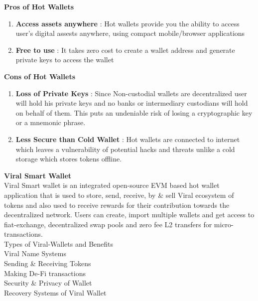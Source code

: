 \documentclass[conference]{IEEEtran}
\begin{document}
\textbf{Pros of Hot Wallets}
\begin{enumerate}[wide, labelwidth=!, labelindent=0pt]
\item \textbf{Access assets anywhere} : Hot wallets provide you the ability to access user's digital assests anywhere, using compact mobile/browser applications
\item \textbf{Free to use} : It takes zero cost to create a wallet address and generate private keys to access the wallet
\end{enumerate}

\textbf{Cons of Hot Wallets}
\begin{enumerate}[wide, labelwidth=!, labelindent=0pt]
\item \textbf{Loss of Private Keys} : Since Non-custodial wallets are decentralized user will hold his private keys and no banks or intermediary custodians will hold on behalf of them. This puts an undeniable risk of losing a cryptographic key or a mnemonic phrase.
\item \textbf{Less Secure than Cold Wallet} : Hot wallets are connected to internet which leaves a vulnerability of potential hacks and threats unlike a cold storage which stores tokens offline.
\end{enumerate}


\textbf{Viral Smart Wallet}\\

Viral Smart wallet is an integrated open-source EVM based hot wallet application that is used to store, send, receive, by \& sell Viral ecosystem of tokens and also used to receive rewards for their contribution towards the decentralized network. Users can create, import multiple wallets and get access to fiat-exchange, decentralized swap pools and zero fee L2 transfers for micro-transactions. \\

Types of Viral-Wallets and Benefits\\

Viral Name Systems\\

Sending \& Receiving Tokens\\

Making De-Fi transactions\\

Security \& Privacy of Wallet\\

Recovery Systems of Viral Wallet\\
\end{document}
